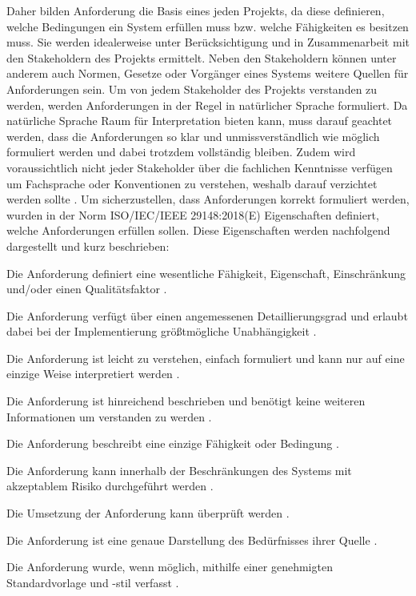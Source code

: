 Daher bilden Anforderung die Basis eines jeden Projekts, da diese definieren, welche Bedingungen ein System erfüllen muss bzw. welche Fähigkeiten 
es besitzen muss. Sie werden idealerweise unter Berücksichtigung und in Zusammenarbeit mit den Stakeholdern des Projekts ermittelt. Neben den 
Stakeholdern können unter anderem auch Normen, Gesetze oder Vorgänger eines Systems weitere Quellen für Anforderungen sein. Um von jedem 
Stakeholder des Projekts verstanden zu werden, werden Anforderungen in der Regel in natürlicher Sprache formuliert. Da natürliche Sprache Raum für 
Interpretation bieten kann, muss darauf geachtet werden, dass die Anforderungen so klar und unmissverständlich wie möglich formuliert werden und dabei 
trotzdem vollständig bleiben. Zudem wird voraussichtlich nicht jeder Stakeholder über die fachlichen Kenntnisse verfügen um Fachsprache oder 
Konventionen zu verstehen, weshalb darauf verzichtet werden sollte \cite[vgl. S.2]{DOORS}. Um sicherzustellen, dass Anforderungen korrekt 
formuliert werden, wurden in der Norm ISO/IEC/IEEE 29148:2018(E) Eigenschaften definiert, welche Anforderungen erfüllen sollen. 
Diese Eigenschaften werden nachfolgend dargestellt und kurz beschrieben:

\begin{description}[style=multiline,leftmargin=3cm,font=\bfseries, nolistsep]
    \item[Notwendig] Die Anforderung definiert eine wesentliche Fähigkeit, Eigenschaft, Einschränkung und/oder einen Qualitätsfaktor \cite[vgl. S.12]{RE-ISO}.
    \item[Angemessen] Die Anforderung verfügt über einen angemessenen Detaillierungsgrad und erlaubt dabei bei der Implementierung größtmögliche Unabhängigkeit \cite[vgl. S.12]{RE-ISO}.
    \item[Eindeutig] Die Anforderung ist leicht zu verstehen, einfach formuliert und kann nur auf eine einzige Weise interpretiert werden \cite[vgl. S.12]{RE-ISO}.
    \item[Komplett] Die Anforderung ist hinreichend beschrieben und benötigt keine weiteren Informationen um verstanden zu werden \cite[vgl. S.12]{RE-ISO}.
    \item[Atomar] Die Anforderung beschreibt eine einzige Fähigkeit oder Bedingung \cite[vgl. S.12]{RE-ISO}.
    \item[Durchführbar] Die Anforderung kann innerhalb der Beschränkungen des Systems mit akzeptablem Risiko durchgeführt werden \cite[vgl. S.13]{RE-ISO}.
    \item[Verifizierbar] Die Umsetzung der Anforderung kann überprüft werden \cite[vgl. S.13]{RE-ISO}.
    \item[Korrekt] Die Anforderung ist eine genaue Darstellung des Bedürfnisses ihrer Quelle \cite[vgl. S.13]{RE-ISO}.
    \item[Konform] Die Anforderung wurde, wenn möglich, mithilfe einer genehmigten Standardvorlage und -stil verfasst \cite[vgl. S.13]{RE-ISO}.
\end{description}


